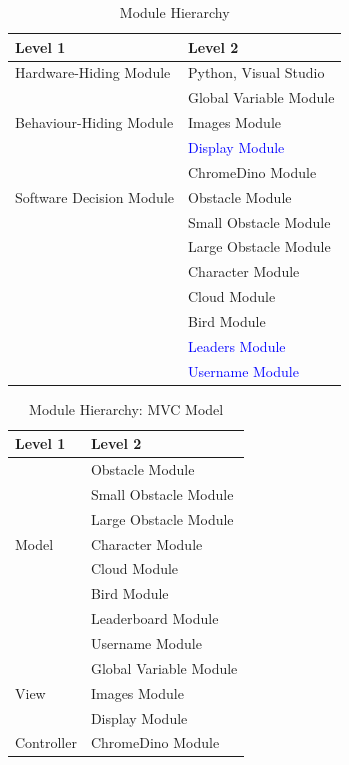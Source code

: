 \documentclass[12pt, titlepage]{article}
\begin{document}
\begin{table}[h!]
\centering
\begin{tabular}{p{} p{}}
\toprule
\textbf{Level 1} & \textbf{Level 2}\\
\midrule

{Hardware-Hiding Module} & Python, Visual Studio\\
\midrule

\multirow{3}{0.3\textwidth}{Behaviour-Hiding Module} & Global Variable Module \\
& Images Module \\
& \textcolor{blue}{Display Module}\\
\midrule

\multirow{3}{0.3\textwidth}{Software Decision Module} & ChromeDino Module\\
& Obstacle Module \\
& Small Obstacle Module \\
& Large Obstacle Module \\
& Character Module \\
& Cloud Module \\
& Bird Module \\
& \textcolor{blue}{Leaders Module} \\
& \textcolor{blue}{Username Module}\\
\bottomrule

\end{tabular}
\caption{Module Hierarchy}
\label{TblMH}
\end{table}

\begin{table}[h!]
\centering
\begin{tabular}{p{} p{}}
\toprule
\textbf{Level 1} & \textbf{Level 2}\\
\midrule


\multirow{7}{0.3\textwidth}{Model} 
& Obstacle Module \\
& Small Obstacle Module \\
& Large Obstacle Module \\
& Character Module \\
& Cloud Module \\
& Bird Module \\
& Leaderboard Module \\
& Username Module \\
\midrule

\multirow{3}{0.3\textwidth}{View} 
& Global Variable Module \\
& Images Module \\
& Display Module \\
\bottomrule

\multirow{1.2}{0.3\textwidth}{Controller} 
& ChromeDino Module \\
\midrule

\end{tabular}
\caption{Module Hierarchy: MVC Model}
\label{TblMH}
\end{table}
\end{document}
